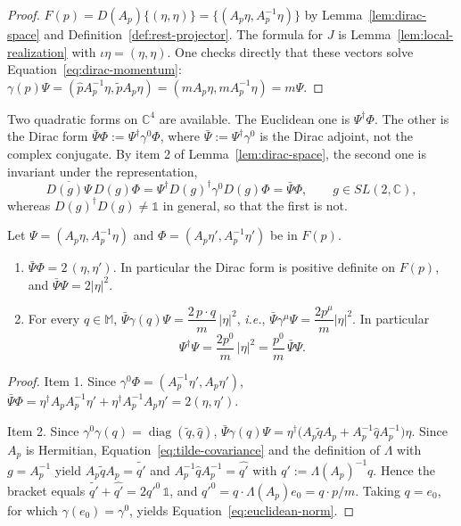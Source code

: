	\begin{proof}
		$F(p)=D(A_p)\{(\eta,\eta)\}=\{(A_p\eta,A_p^{-1}\eta)\}$ by Lemma~\ref{lem:dirac-space} and Definition~\ref{def:rest-projector}. The formula for $J$ is Lemma~\ref{lem:local-realization} with $\iota\eta=(\eta,\eta)$. One checks directly that these vectors solve Equation~\eqref{eq:dirac-momentum}: $\gamma(p)\Psi=(\hat{p}A_p^{-1}\eta,\tilde{p}A_p\eta)=(mA_p\eta,mA_p^{-1}\eta)=m\Psi$.
	\end{proof}
	
	\noindent Two quadratic forms on $\mathbb{C}^4$ are available. The Euclidean one is $\Psi^\dagger\Phi$. The other is the Dirac form $\bar{\Psi}\Phi:=\Psi^\dagger\gamma^0\Phi$, where $\bar{\Psi}:=\Psi^\dagger\gamma^0$ is the Dirac adjoint, not the complex conjugate. By item 2 of Lemma~\ref{lem:dirac-space}, the second one is invariant under the representation,
	\begin{equation}\label{eq:dirac-form-invariance}
		\overline{D(g)\Psi}\,D(g)\Phi=\Psi^\dagger D(g)^\dagger\gamma^0D(g)\Phi=\bar{\Psi}\Phi, \qquad g\in SL(2,\mathbb{C}),
	\end{equation}
	whereas $D(g)^\dagger D(g)\neq\mathbb{1}$ in general, so that the first is not.
	
	\begin{proposition}\label{prop:norms}
		Let $\Psi=(A_p\eta,A_p^{-1}\eta)$ and $\Phi=(A_p\eta',A_p^{-1}\eta')$ be in $F(p)$.
		\begin{enumerate}
			\item $\bar{\Psi}\Phi=2\,(\eta,\eta')$. In particular the Dirac form is positive definite on $F(p)$, and $\bar{\Psi}\Psi=2|\eta|^2$.
			\item For every $q\in\mathbb{M}$, $\bar{\Psi}\gamma(q)\Psi=\dfrac{2\,p\cdot q}{m}\,|\eta|^2$, \textit{i.e.}, $\bar{\Psi}\gamma^\mu\Psi=\dfrac{2p^\mu}{m}|\eta|^2$. In particular
			\begin{equation}\label{eq:euclidean-norm}
				\Psi^\dagger\Psi=\frac{2p^0}{m}\,|\eta|^2=\frac{p^0}{m}\,\bar{\Psi}\Psi.
			\end{equation}
		\end{enumerate}
	\end{proposition}
	
	\begin{proof}
		Item 1. Since $\gamma^0\Phi=(A_p^{-1}\eta',A_p\eta')$, $\bar{\Psi}\Phi=\eta^\dagger A_pA_p^{-1}\eta'+\eta^\dagger A_p^{-1}A_p\eta'=2(\eta,\eta')$.
		
		Item 2. Since $\gamma^0\gamma(q)=\operatorname{diag}(\tilde{q},\hat{q})$, $\bar{\Psi}\gamma(q)\Psi=\eta^\dagger\big(A_p\tilde{q}A_p+A_p^{-1}\hat{q}A_p^{-1}\big)\eta$. Since $A_p$ is Hermitian, Equation~\eqref{eq:tilde-covariance} and the definition of $\Lambda$ with $g=A_p^{-1}$ yield $A_p\tilde{q}A_p=\widetilde{q'}$ and $A_p^{-1}\hat{q}A_p^{-1}=\widehat{q'}$ with $q':=\Lambda(A_p)^{-1}q$. Hence the bracket equals $\widetilde{q'}+\widehat{q'}=2q'^0\,\mathbb{1}$, and $q'^0=q\cdot\Lambda(A_p)e_0=q\cdot p/m$. Taking $q=e_0$, for which $\gamma(e_0)=\gamma^0$, yields Equation~\eqref{eq:euclidean-norm}.
	\end{proof}
	
